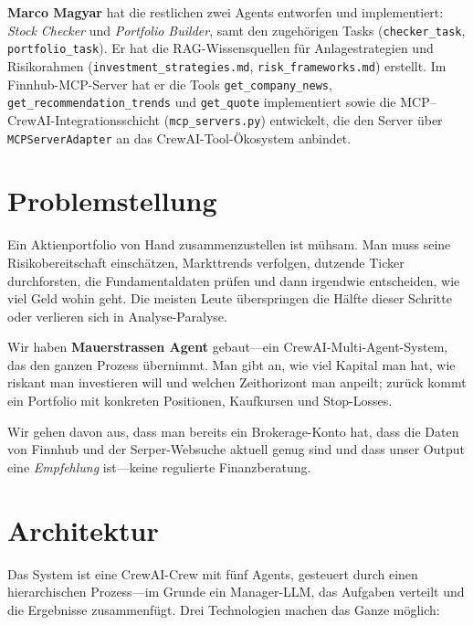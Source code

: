 \documentclass[conference]{IEEEtran}
\begin{document}
\textbf{Marco Magyar} hat die restlichen zwei Agents entworfen und
implementiert: \emph{Stock Checker} und \emph{Portfolio Builder}, samt
den zugehörigen Tasks (\texttt{checker\_task},
\texttt{portfolio\_task}). Er hat die RAG-Wissensquellen für
Anlagestrategien und Risikorahmen (\texttt{investment\_strategies.md},
\texttt{risk\_frameworks.md}) erstellt. Im Finnhub-MCP-Server hat er
die Tools \texttt{get\_company\_news},
\texttt{get\_recommendation\_trends} und \texttt{get\_quote}
implementiert sowie die MCP--CrewAI-Integrationsschicht
(\texttt{mcp\_servers.py}) entwickelt, die den Server über
\texttt{MCPServerAdapter} an das CrewAI-Tool-Ökosystem anbindet.

\section{Problemstellung}

Ein Aktienportfolio von Hand zusammenzustellen ist mühsam. Man muss
seine Risikobereitschaft einschätzen, Markttrends verfolgen, dutzende
Ticker durchforsten, die Fundamentaldaten prüfen und dann irgendwie
entscheiden, wie viel Geld wohin geht. Die meisten Leute überspringen
die Hälfte dieser Schritte oder verlieren sich in Analyse-Paralyse.

Wir haben \textbf{Mauerstrassen Agent} gebaut---ein
CrewAI-Multi-Agent-System, das den ganzen Prozess
übernimmt. Man gibt an, wie viel Kapital man hat, wie riskant man
investieren will und welchen Zeithorizont man anpeilt; zurück kommt ein
Portfolio mit konkreten Positionen, Kaufkursen und Stop-Losses.

Wir gehen davon aus, dass man bereits ein Brokerage-Konto hat, dass
die Daten von Finnhub und der Serper-Websuche
aktuell genug sind und dass unser Output eine
\emph{Empfehlung} ist---keine regulierte Finanzberatung.

\section{Architektur}

Das System ist eine CrewAI-Crew mit fünf Agents, gesteuert durch einen
hierarchischen Prozess---im Grunde ein Manager-LLM, das Aufgaben
verteilt und die Ergebnisse zusammenfügt. Drei Technologien machen das
Ganze möglich:
\end{document}
